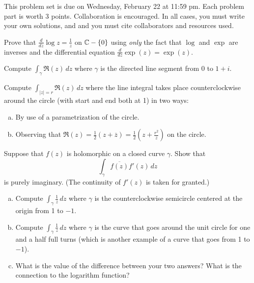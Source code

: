 \maketitle

This problem set is due on Wednesday, February 22 at 11:59 pm. Each problem part is worth 3 points. Collaboration is encouraged. In all cases, you must write your own solutions, and and you must cite collaborators and resources used.

\begin{problem}
  Prove that $\frac d{dz}\log z=\frac 1z$ on $\mathbb{C}-\{0\}$ using \emph{only} the fact that $\log$ and $\exp$ are inverses and the differential equation $\frac d{dz}\exp(z)=\exp(z)$.
\end{problem}

\begin{problem}
  Compute $\int_\gamma \Re(z)\,dz$ where $\gamma$ is the directed line segment from 0 to $1+i$.
\end{problem}

\begin{problem}
  Compute $\int_{|z|=r}\Re(z)\,dz$ where the line integral takes place counterclockwise around the circle (with start and end both at 1) in two ways:
  \begin{enumerate}[(a)]
    \item By use of a parametrization of the circle.
    \item Observing that $\Re(z)=\frac 12(z+\overline z)=\frac 12\left(z+\frac{r^2}z\right)$ on the circle.
  \end{enumerate}
\end{problem}

\begin{problem}
  Suppose that $f(z)$ is holomorphic on a closed curve $\gamma$. Show that
  \[\int_\gamma\overline{f(z)}f'(z)\,dz\]
  is purely imaginary. (The continuity of $f'(z)$ is taken for granted.)
\end{problem}

\begin{problem}
  \leavevmode\begin{enumerate}[(a)]
    \item Compute $\int_\gamma \frac 1z\,dz$ where $\gamma$ is the counterclockwise semicircle centered at the origin from 1 to $-1$.
    \item Compute $\int_\gamma \frac 1z\,dz$ where $\gamma$ is the curve that goes around the unit circle for one and a half full turns (which is another example of a curve that goes from 1 to $-1$).
    \item What is the value of the difference between your two answers? What is the connection to the logarithm function?
  \end{enumerate}
\end{problem}

